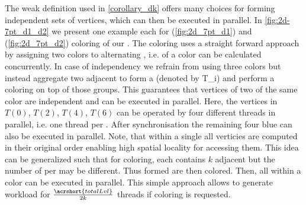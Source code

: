  The weak definition used in \cref{corollary_dk} offers many choices for forming \DK independent sets of vertices, which can then be executed in parallel. 
 In  \cref{fig:2d-7pt_d1_d2} we present one example each for \DONE (\cref{fig:2d_7pt_d1}) and \DTWO (\cref{fig:2d_7pt_d2}) coloring of our \stex. The \DONE coloring uses a straight forward approach by assigning two colors to alternating \levels, i.e. \levels of a color can be calculated concurrently. In case of \DTWO independency we refrain from using three colors but instead aggregate two adjacent \levels to form a \textit{\levelGroup} (denoted by \acrshort{T_i}) and perform a \DONE coloring on top of those groups. This guarantees that vertices of two \levelGroups of the same color are \DTWO independent and can be executed in parallel. Here, the vertices in $T(0)$, $T(2)$, $T(4)$, $T(6)$ can be operated by four different threads in parallel, i.e. one thread per \levelGroup.  After synchronisation the remaining four blue \levelGroups can also be executed in parallel. Note, that within a single \levelGroup all verticies are computed in their original order enabling high spatial locality for accessing them. This idea can be generalized such that for \DK coloring, each \levelGroup contains \atleast $k$ adjacent \levels but the number of \sout{\levels}  per \levelGroup may be different. Thus formed \levelGroups are then \DONE colored. Then, all \levelGroups within a color can be executed in parallel. This simple approach allows to generate workload for $\frac{\acrshort{totalLvl}}{2 k}$ threads if \DK coloring is requested.
 
